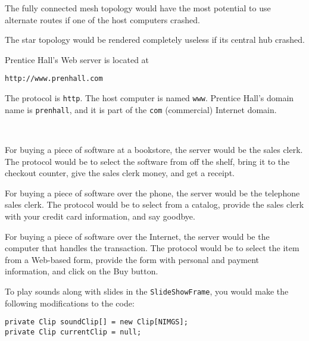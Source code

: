 {{{{\begin{ANS}
\item  The fully connected mesh topology would have the most potential
to use alternate routes if one of the host computers crashed.

\item  The star topology would be rendered completely useless if
its central hub crashed.

\item  Prentice Hall's Web server is located at

\begin{jjjlisting}
\begin{lstlisting}[commentstyle=\color{black}]
http://www.prenhall.com 
\end{lstlisting}
\end{jjjlisting}

\noindent The protocol is {\tt http}. The host computer is named {\tt www}.
Prentice Hall's domain name is {\tt prenhall}, and it is part of the
{\tt com} (commercial) Internet domain.


\item  \mbox{ }
\begin{ANSBL}
\item  For buying a piece of software at a bookstore,
the server would be the sales clerk.  The protocol would
be to select the software from off the shelf, bring
it to the checkout counter, give the sales clerk 
money, and get a receipt.

\item  For buying a piece of software over the phone,
the server would be the telephone sales clerk.  The protocol would
be to select from a catalog, provide the sales clerk with
your credit card information, and say goodbye.

\item  For buying a piece of software over the Internet,
the server would be the computer that handles the transaction.  The
protocol would be to select the item from a Web-based form, provide
the form with personal and payment information, and click on the
Buy button.
\end{ANSBL}


\item  To play sounds along with slides in the {\tt SlideShowFrame},
you would make the following modifications to the code:
\begin{jjjlisting}
\begin{lstlisting}
private Clip soundClip[] = new Clip[NIMGS];
private Clip currentClip = null;
\end{lstlisting}
\end{jjjlisting}


\end{ANS}}}}}
